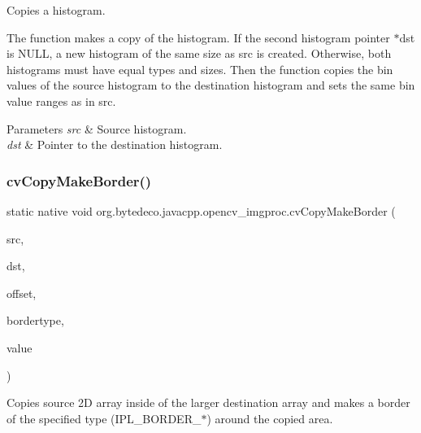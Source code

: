 Copies a histogram. 

The function makes a copy of the histogram. If the second histogram pointer $\ast$dst is N\+U\+LL, a new histogram of the same size as src is created. Otherwise, both histograms must have equal types and sizes. Then the function copies the bin values of the source histogram to the destination histogram and sets the same bin value ranges as in src. 


\begin{DoxyParams}{Parameters}
{\em src} & Source histogram. \\
\hline
{\em dst} & Pointer to the destination histogram. \\
\hline
\end{DoxyParams}
\mbox{\label{group__imgproc__c_ga46ab19adc04378f8728b90f45240f5da}} 
\subsubsection{\texorpdfstring{cv\+Copy\+Make\+Border()}{cvCopyMakeBorder()}}
{\footnotesize\ttfamily static native void org.\+bytedeco.\+javacpp.\+opencv\+\_\+imgproc.\+cv\+Copy\+Make\+Border (\begin{DoxyParamCaption}\item[{@Const Cv\+Arr}]{src,  }\item[{Cv\+Arr}]{dst,  }\item[{@By\+Val Cv\+fr.antproject.utils.Point}]{offset,  }\item[{int}]{bordertype,  }\item[{@By\+Val(null\+Value=\char`\"{}Cv\+Scalar(cv\+Scalar\+All(0))\char`\"{}) Cv\+Scalar}]{value }\end{DoxyParamCaption})\hspace{0.3cm}{\ttfamily [static]}}

Copies source 2D array inside of the larger destination array and makes a border of the specified type (I\+P\+L\+\_\+\+B\+O\+R\+D\+E\+R\+\_\+$\ast$) around the copied area. \mbox{\label{group__imgproc__c_gac7c346a2a54d8136a2e572578f029e62}} 
